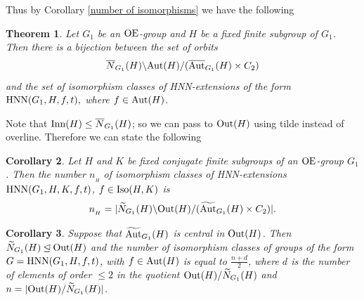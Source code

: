 \documentclass[a4paper,12pt]{article}
\newtheorem{thm}{Theorem}[section]
\newtheorem{cor}[thm]{Corollary}
\def\OE{{\rm OE}}
\def\aut {{\rm Aut}}
\def\out {{\rm Out}}
\def\inn {{\rm Inn}}
\def\hnn {{\rm HNN}}
\def\Iso {{\rm Iso}}
\newtheorem{rem}[thm]{Remark}
\begin{document}
{Thus by %
Corollary \ref{number of isomorphisms} we have the following

\begin{thm} Let $G_1$ be an $\OE$-group and $H$ be a fixed finite subgroup of $G_1$.
Then there is a bijection between   the set of orbits \begin{equation} \label{a bijecao das orbitas} \overline{N}_{G_1}(H) \backslash \aut(H)/ ( \overline{\aut}_{G_1}(H) \times C_2) \end{equation} and the set of isomorphism classes of HNN-extensions of the form $\hnn(G_1, H, f, t),$ where $f\in \aut(H)$.\end{thm}

 Note that $\inn(H)\leq \overline{N}_{G_1}(H)$; so we can pass to $\out(H)$ using tilde instead of overline. 
Therefore
we can state the following
 



 \begin{cor}\label{corhnn} Let $H$ and $K$ be fixed conjugate finite subgroups of an $\OE$-group $G_1$. Then the number $n_{_{H}}$  
 of isomorphism classes of HNN-extensions $\hnn(G_1, H, K, f,t)$,  $f \in \Iso(H, K)$  %
 is $$n_{_{H}}=|\widetilde{N}_{G_1}(H) \backslash \out(H)/  ( \widetilde{\aut}_{G_1}(H) \times C_2) |.$$ 
 \end{cor}  




\begin{cor}\label{g1} %
Suppose that $\widetilde{\aut}_{G_1}(H)$ is central in $\out(H)$. Then $\widetilde{N}_{G_1}(H) \\ \unlhd \out(H)$ and the number of isomorphism classes of groups of the form $G=\hnn(G_1,H,f, t)$, with $f\in \aut(H)$ is equal to $\frac{n+d}{2}$, where $d$ is the number of elements of order $\leq 2$ in the quotient  $\out(H)/\widetilde{N}_{G_1}(H)$ and $n=|\out(H)/\widetilde{N}_{G_1}(H)|$.
\end{cor}

}
\end{document}
